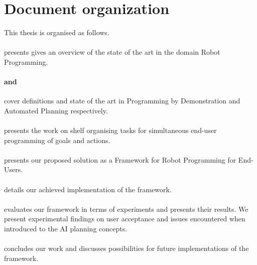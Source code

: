 \section{Document organization}
This thesis is organised as follows. 

\paragraph{} presents gives an overview of the state of the art in the domain Robot Programming.

\paragraph{ and } cover definitions and state of the art in Programming by Demonstration and Automated Planning respectively.

\paragraph{} presents the work on shelf organising tasks for simultaneous end-user programming of goals and actions.

\paragraph{} presents our proposed solution as a Framework for Robot Programming for End-Users.

\paragraph{} details our achieved implementation of the framework. 

\paragraph{} evaluates our framework in terms of experiments and presents their results. We present experimental findings on user acceptance and issues encountered when introduced to the AI planning concepts.

\paragraph{} concludes our work and discusses possibilities for future implementations of the framework.
